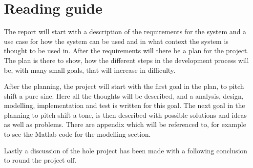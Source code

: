 
\chapter*{Reading guide}
The report will start with a description of the requirements for the system and a use case for how the system can be used and in what context the system is thought to be used in.
After the requirements will there be a plan for the project.
The plan is there to show, how the different steps in the development process will be, with many small goals, that will increase in difficulty.

After the planning, the project will start with the first goal in the plan, to pitch shift a pure sine. 
Here all the thoughts will be described, and a analysis, design, modelling, implementation and test is written for this goal. 
The next goal in the planning to pitch shift a tone, is then described with possible solutions and ideas as well as problems.
There are appendix which will be referenced to, for example to see the Matlab code for the modelling section. 

Lastly a discussion of the hole project has been made with a following conclusion to round the project off. 
